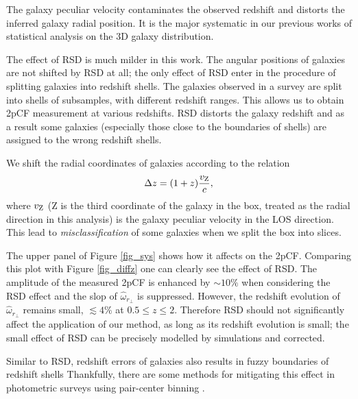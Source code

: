 \documentclass[iop]{emulateapj}
\begin{document}
The galaxy peculiar velocity contaminates the observed redshift and distorts 
the inferred galaxy radial position.
It is the major systematic in our previous works \citep{Li2014,Li2015,Li2016}
of statistical analysis on the 3D galaxy distribution.

The effect of RSD is much milder in this work. 
The angular positions of galaxies are not shifted by RSD at all;
the only effect of RSD enter in the procedure of 
splitting galaxies into redshift shells.
The galaxies observed in a survey are split into shells of subsamples, 
with different redshift ranges. This allows us to obtain 2pCF measurement at various redshifts.
RSD distorts the galaxy redshift and as a result some galaxies 
(especially those close to the boundaries of shells) are assigned to the wrong redshift shells.

We shift the radial coordinates of galaxies according to the relation 
\begin{equation}\label{eq:zvpeu}
\Delta z = (1+z) \frac{v_{{\rm Z}}}{c},
\end{equation}
where $v_{{\rm Z}}$ (Z is the third coordinate of the galaxy in the box, treated as the radial direction in this analysis) 
is the galaxy peculiar velocity in the LOS direction.
This lead to {\it misclassification} of some galaxies when we split the box into slices.

The upper panel of Figure \ref{fig_sys} shows how it affects on the 2pCF.
Comparing this plot with Figure \ref{fig_diffz} one can clearly see the effect of RSD.
The amplitude of the measured 2pCF is enhanced by $\sim 10\%$ when considering the RSD effect 
and the slop of $\hat\omega_{r_\perp}$ is suppressed.
However, the redshift evolution of $\hat\omega_{r_\perp}$ remains small,  $\lesssim4\%$ at $0.5\leq z \leq 2$.
Therefore RSD should not significantly affect the application of our method, as long as its redshift evolution is small;
the small effect of RSD can be precisely modelled by simulations and corrected.

Similar to RSD, redshift errors of galaxies
also results in fuzzy boundaries of redshift shells
Thankfully, there are some methods for mitigating this effect in photometric surveys using pair-center binning \citep{2010MNRAS.407..520N}. 
\end{document}
